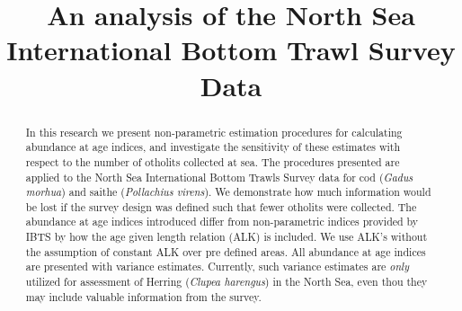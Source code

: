 \documentclass[a4paper 12pt]{article}
\title{\bf 
}
\author{}
\date{}
\numberwithin{equation}{section}
\begin{document}
\title{An analysis of the North Sea International Bottom Trawl Survey Data}

\maketitle


\begin{abstract}
In this research we present non-parametric estimation procedures for calculating abundance at age indices, and investigate the sensitivity of these estimates with respect to the number of otholits collected at sea. The procedures presented are applied to the North Sea International Bottom Trawls Survey data for cod (\textit{Gadus morhua}) and saithe (\textit{Pollachius virens}). We demonstrate how much information would be lost if the survey design was defined such that fewer otholits were collected. The abundance at age indices introduced differ from non-parametric indices provided by IBTS by how the age given length relation (ALK) is included. We use ALK's without the assumption of constant ALK over pre defined areas. All abundance at age indices are presented with variance estimates. Currently, such variance estimates are \textit{only} utilized for assessment of Herring (\textit{Clupea harengus}) in the North Sea, even thou they may include valuable information from the survey.

\end{abstract}
\end{document}
